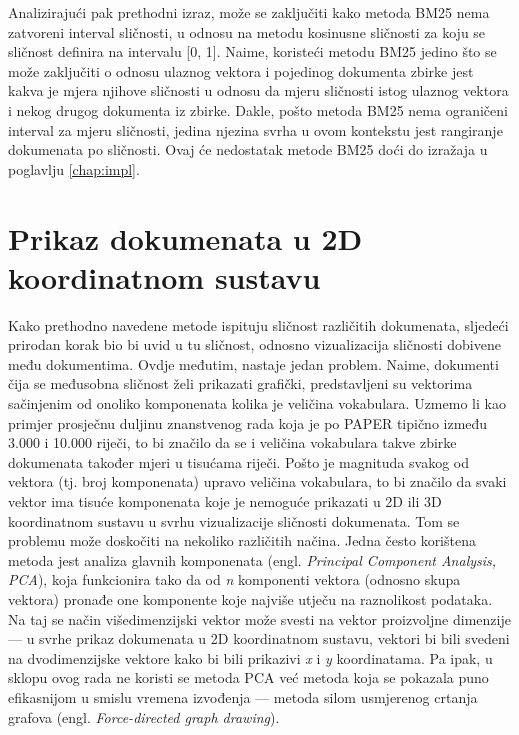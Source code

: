 \documentclass[times, utf8, zavrsni]{fer}
\begin{document}
Analizirajući pak prethodni izraz, može se zaključiti kako metoda BM25 nema zatvoreni interval sličnosti, u odnosu na metodu kosinusne sličnosti za koju se sličnost definira na intervalu [0, 1]. Naime, koristeći metodu BM25 jedino što se može zaključiti o odnosu ulaznog vektora i pojedinog dokumenta zbirke jest kakva je mjera njihove sličnosti u odnosu da mjeru sličnosti istog ulaznog vektora i nekog drugog dokumenta iz zbirke. Dakle, pošto metoda BM25 nema ograničeni interval za mjeru sličnosti, jedina njezina svrha u ovom kontekstu jest rangiranje dokumenata po sličnosti. Ovaj će nedostatak metode BM25 doći do izražaja u poglavlju \ref{chap:impl}.

\chapter{Prikaz dokumenata u 2D koordinatnom sustavu}
\label{chap:docsin2d}
Kako prethodno navedene metode ispituju sličnost različitih dokumenata, sljedeći prirodan korak bio bi uvid u tu sličnost, odnosno vizualizacija  sličnosti dobivene među dokumentima. Ovdje međutim, nastaje jedan problem. Naime, dokumenti čija se međusobna sličnost želi prikazati grafički, predstavljeni su vektorima sačinjenim od onoliko komponenata kolika je veličina vokabulara. Uzmemo li kao primjer prosječnu duljinu znanstvenog rada koja je po PAPER tipično između 3.000 i 10.000 riječi, to bi značilo da se i veličina vokabulara takve zbirke dokumenata također mjeri u tisućama riječi. Pošto je magnituda svakog od vektora (tj. broj komponenata) upravo veličina vokabulara, to bi značilo da svaki vektor ima tisuće komponenata koje je nemoguće prikazati u 2D ili 3D koordinatnom sustavu u svrhu vizualizacije sličnosti dokumenata. Tom se problemu može doskočiti na nekoliko različitih načina. Jedna često korištena metoda jest analiza glavnih komponenata (engl. \textit{Principal Component Analysis, PCA}), koja funkcionira tako da od \textit{n} komponenti vektora (odnosno skupa vektora) pronađe one komponente koje najviše utječu na raznolikost podataka. Na taj se način višedimenzijski vektor može svesti na vektor proizvoljne dimenzije — u svrhe prikaz dokumenata u 2D koordinatnom sustavu, vektori bi bili svedeni na dvodimenzijske vektore kako bi bili prikazivi \textit{x} i \textit{y} koordinatama. Pa ipak, u sklopu ovog rada ne koristi se metoda PCA već metoda koja se pokazala puno efikasnijom u smislu vremena izvođenja — metoda silom usmjerenog crtanja grafova (engl. \textit{Force-directed graph drawing}).
\end{document}
